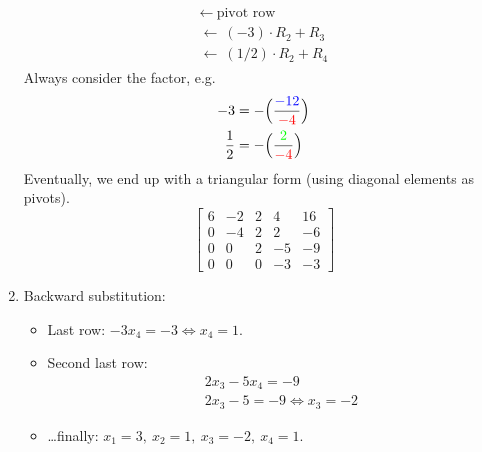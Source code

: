 \begin{example}
\begin{enumerate}[font={\bfseries}, label={Step \arabic*.}]
{\begin{align*}
{\begin{array}{l}
                    \leftarrow\ \text{pivot row}\\
                    \leftarrow\ (-3) \cdot R_2 + R_3 \\
                    \leftarrow\ (1/2) \cdot R_2 + R_4
                \end{array}}
            \end{align*}
            Always consider the factor, e.g.
            \begin{align*}
                -3 &= -\Bigl(\frac{\textcolor{blue}{-12}}{\textcolor{red}{-4}}\Bigr)
                \\
                \frac{1}{2} &= -\Bigl(\frac{\textcolor{green}{2}}{\textcolor{red}{-4}}\Bigr)
            \end{align*}
            Eventually, we end up with a triangular form (using diagonal elements as pivots).
            \[
                \left[\begin{array}{cccc|c}
                    6 & -2 & 2 & 4 & 16\\
                    0 & -4 & 2 & 2 & -6\\
                    0 & 0 & 2 & -5 & -9\\
                    0 & 0 & 0 & -3 & -3
                \end{array}\right]
            \]
        }
        \item {
            Backward substitution:
            \begin{itemize}
                \item {
                    Last row: $-3 x_4 = -3 \Longleftrightarrow x_4 = 1$.
                }
                \item {
                    Second last row:
                    \begin{align*}
                        &2 x_3 - 5x_4 = -9\\
                        &2x_3 - 5 = -9 \Longleftrightarrow x_3 = -2
                    \end{align*}
                }
                \item {
                    \dots finally:
                    $x_1 = 3,\ x_2 = 1,\ x_3 = -2,\ x_4 = 1$.
                }
            \end{itemize}
        }
    \end{enumerate}
\end{example}


